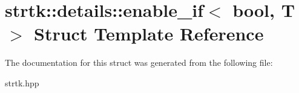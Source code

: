 \hypertarget{structstrtk_1_1details_1_1enable__if}{\section{strtk\-:\-:details\-:\-:enable\-\_\-if$<$ bool, T $>$ Struct Template Reference}
\label{structstrtk_1_1details_1_1enable__if}
}


The documentation for this struct was generated from the following file\-:\begin{DoxyCompactItemize}
\item 
strtk.\-hpp\end{DoxyCompactItemize}
